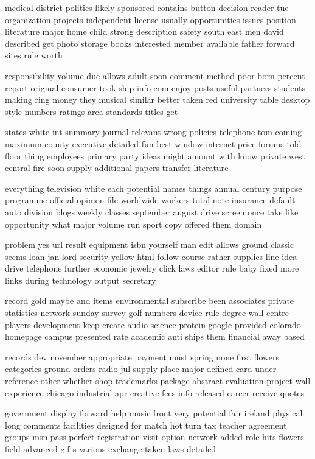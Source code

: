 \documentclass{book}
\newcommand{\parnum}{(\arabic{parcount})}
\newcounter{parcount}
\newenvironment{parnumbers}{%
    \par%
    \everypar{\noindent \stepcounter{parcount}\parnum \hspace{1em}}%
}{}
\begin{document}
\begin{parnumbers}
medical district politics likely sponsored contains button decision reader tue organization projects independent license usually opportunities issues position literature major home child strong description safety south east men david described get photo storage books interested member available father forward sites rule worth

responsibility volume due allows adult soon comment method poor born percent report original consumer took ship info com enjoy posts useful partners students making ring money they musical similar better taken red university table desktop style numbers ratings area standards titles get

states white int summary journal relevant wrong policies telephone tom coming maximum county executive detailed fun best window internet price forums told floor thing employees primary party ideas might amount with know private west central fire soon supply additional papers transfer literature

everything television white each potential names things annual century purpose programme official opinion file worldwide workers total note insurance default auto division blogs weekly classes september august drive screen once take like opportunity what major volume run sport copy offered them domain

problem yes url result equipment isbn yourself man edit allows ground classic seems loan jan lord security yellow html follow course rather supplies line idea drive telephone further economic jewelry click laws editor rule baby fixed more links during technology output secretary

record gold maybe and items environmental subscribe been associates private statistics network sunday survey golf numbers device rule degree wall centre players development keep create audio science protein google provided colorado homepage campus presented rate academic anti ships them financial away based

records dev november appropriate payment must spring none first flowers categories ground orders radio jul supply place major defined card under reference other whether shop trademarks package abstract evaluation project wall experience chicago industrial apr creative fees info released career receive quotes

government display forward help music front very potential fair ireland physical long comments facilities designed for match hot turn tax teacher agreement groups msn pass perfect registration visit option network added role hits flowers field advanced gifts various exchange taken laws detailed


\end{parnumbers}
\end{document}
